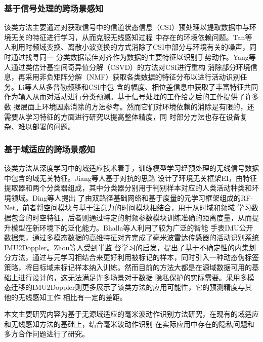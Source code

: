 \subsubsection{基于信号处理的跨场景感知}

该类方法主要通过对获取信号中的信道状态信息（CSI）预处理以提取数据中与环境无关的特征进行学习，从而克服无线感知过程
中存在的环境依赖问题。Tan等人\cite{tan2016wifinger}利用时频域变换、离散小波变换的方式消除了CSI中部分与环境有关的噪声，同时通过找寻同一
分类数据最佳对齐作为数据的主要特征以识别手势动作。Yang等人\cite{yang2018fine}通过类估计基空间奇异值分解（CSVD）的方法对CSI进行重构
消除部分环境信息，再采用非负矩阵分解（NMF）获取各类数据的特征分布以进行活动识别任务。Li等人\cite{li2018wifit}从多普勒频移和CSI中包
含的幅度、相位差信息中获取了丰富特征共同作为输入从而对活动进行分类预测。基于信号处理的工作给之后的工作提供了许多数
据层面上环境因素消除的方法参考。然而它们对环境依赖的消除是有限的，还需要从学习特征的方面进行研究以提高整体精度，同
时部分方法也存在设备复杂、难以部署的问题。

\subsubsection{基于域适应的跨场景感知}

该类方法从深度学习中的域适应技术着手，训练模型学习经预处理的无线信号数据中包含的域无关特征。Jiang等人\cite{jiang2018towards}基于对抗的思路
设计了环境无关框架EI，由特征提取器和两个分类器组成，其中分类器分别用于判别样本对应的人类活动种类和环境领域。Ding等人\cite{ding2020rf}提出
了由双路径基础网络和基于度量的元学习框架组成的RF-Net。前者将空间模块与基于注意力的时间模块相结合，用于从时域和频域
学习数据包含的时空特征，后者则通过特定的射频参数模块训练准确的距离度量，从而提升模型在新环境下的泛化能力。Bhalla等人\cite{bhalla2021imu2doppler}利用了较为广泛的智能
手表IMU公开数据集，通过多模态数据的高维特征对齐完成了毫米波雷达传感器的活动识别系统IMU2Doppler。Zhou等人\cite{zhou2022target}受到半监
督学习的启发，提出了基于不确定性的内集划分方法，通过与元学习相结合来更好利用被标记的样本，同时引入一种动态伪标签
策略，将目标域未标记样本纳入训练。然而目前的方法大都是在源域数据可用的基础上进行设计的，这无法满足许多场景对于数据
隐私保护的实际需要。采用多模态迁移的IMU2Doppler则更多展示了该类方法的应用可能性，它的预测精度与其他的无线感知工作
相比有一定的差距。


本文主要研究内容为基于无源域适应的毫米波动作识别方法研究，在现有的域适应和无线感知方法的基础上，结合毫米波动作识别
在实际应用中存在的隐私问题和多方合作问题进行了研究。

